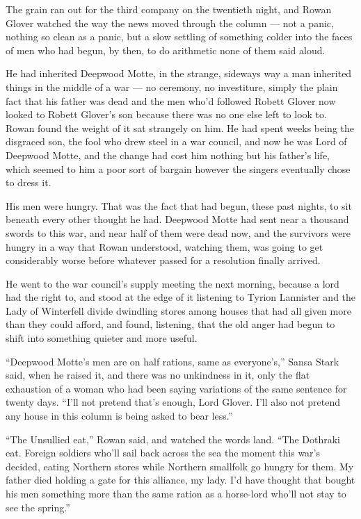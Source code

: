 The grain ran out for the third company on the twentieth night, and Rowan Glover watched the way the news moved through the column — not a panic, nothing so clean as a panic, but a slow settling of something colder into the faces of men who had begun, by then, to do arithmetic none of them said aloud.

He had inherited Deepwood Motte, in the strange, sideways way a man inherited things in the middle of a war — no ceremony, no investiture, simply the plain fact that his father was dead and the men who’d followed Robett Glover now looked to Robett Glover’s son because there was no one else left to look to. Rowan found the weight of it sat strangely on him. He had spent weeks being the disgraced son, the fool who drew steel in a war council, and now he was Lord of Deepwood Motte, and the change had cost him nothing but his father’s life, which seemed to him a poor sort of bargain however the singers eventually chose to dress it.

His men were hungry. That was the fact that had begun, these past nights, to sit beneath every other thought he had. Deepwood Motte had sent near a thousand swords to this war, and near half of them were dead now, and the survivors were hungry in a way that Rowan understood, watching them, was going to get considerably worse before whatever passed for a resolution finally arrived.

He went to the war council’s supply meeting the next morning, because a lord had the right to, and stood at the edge of it listening to Tyrion Lannister and the Lady of Winterfell divide dwindling stores among houses that had all given more than they could afford, and found, listening, that the old anger had begun to shift into something quieter and more useful.

\sceneBreak

“Deepwood Motte’s men are on half rations, same as everyone’s,” Sansa Stark said, when he raised it, and there was no unkindness in it, only the flat exhaustion of a woman who had been saying variations of the same sentence for twenty days. “I’ll not pretend that’s enough, Lord Glover. I’ll also not pretend any house in this column is being asked to bear less.”

“The Unsullied eat,” Rowan said, and watched the words land. “The Dothraki eat. Foreign soldiers who’ll sail back across the sea the moment this war’s decided, eating Northern stores while Northern smallfolk go hungry for them. My father died holding a gate for this alliance, my lady. I’d have thought that bought his men something more than the same ration as a horse-lord who’ll not stay to see the spring.”

